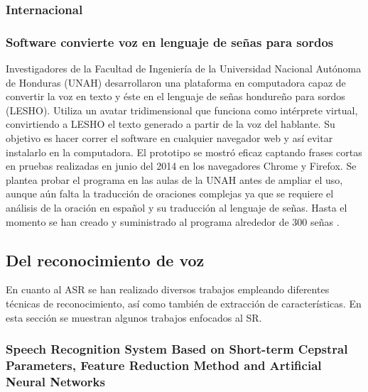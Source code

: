 	\subsubsection*{Internacional}

	\subsubsection*{Software convierte voz en lenguaje de señas para sordos}

	Investigadores de la Facultad de Ingeniería de la Universidad Nacional Autónoma de Honduras (UNAH) desarrollaron una plataforma en computadora capaz de convertir la voz en texto y éste en el lenguaje de señas hondureño para sordos (LESHO). Utiliza un avatar tridimensional que funciona como intérprete virtual, convirtiendo a LESHO el texto generado a partir de la voz del hablante.
	Su objetivo es hacer correr el software en cualquier navegador web y así evitar instalarlo en la computadora. El prototipo se mostró eficaz captando frases cortas en pruebas realizadas en junio del 2014 en los navegadores Chrome y Firefox.
	Se plantea probar el programa en las aulas de la UNAH antes de ampliar el uso, aunque aún falta la traducción de oraciones complejas ya que se requiere el análisis de la oración en español y su traducción al lenguaje de señas. Hasta el momento se han creado y suministrado al programa alrededor de 300 señas \cite{Oliveira2014}.

	
	
	\subsection{Del reconocimiento de voz}\label{sub:sr}

	En cuanto al ASR se han realizado diversos trabajos empleando diferentes técnicas de reconocimiento, así como también de extracción de características. En esta sección se muestran algunos trabajos enfocados al SR.

	\subsubsection*{Speech Recognition System Based on Short-term Cepstral Parameters, Feature Reduction Method and Artificial Neural Networks \cite{Nawel2016}}\label{sub:sota:Nawel2016}
	
